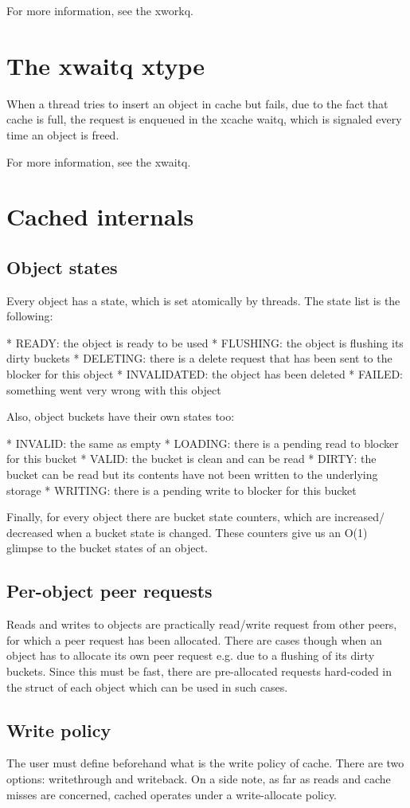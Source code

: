 For more information, see the xworkq.

\section{The xwaitq xtype}

When a thread tries to insert an object in cache but fails, due to the fact
that cache is full, the request is enqueued in the xcache waitq, which is
signaled every time an object is freed.

For more information, see the xwaitq.

\section{Cached internals}

\subsection{Object states}

Every object has a state, which is set atomically by threads. The state list is
the following:

* READY: the object is ready to be used
* FLUSHING: the object is flushing its dirty buckets
* DELETING: there is a delete request that has been sent to the blocker for
  this object
* INVALIDATED: the object has been deleted
* FAILED: something went very wrong with this object

Also, object buckets have their own states too:

* INVALID: the same as empty
* LOADING: there is a pending read to blocker for this bucket
* VALID: the bucket is clean and can be read
* DIRTY: the bucket can be read but its contents have not been written to the
  underlying storage
* WRITING: there is a pending write to blocker for this bucket

Finally, for every object there are bucket state counters, which are increased/
decreased when a bucket state is changed. These counters give us an O(1)
glimpse to the bucket states of an object.

\subsection{Per-object peer requests}

Reads and writes to objects are practically read/write request from other
peers, for which a peer request has been allocated. There are cases though
when an object has to allocate its own peer request e.g. due to a flushing of
its dirty buckets. Since this must be fast, there are pre-allocated requests
hard-coded in the struct of each object which can be used in such cases.

\subsection{Write policy}

The user must define beforehand what is the write policy of cache. There are
two options: writethrough and writeback. On a side note, as far as reads and
cache misses are concerned, cached operates under a write-allocate policy.

